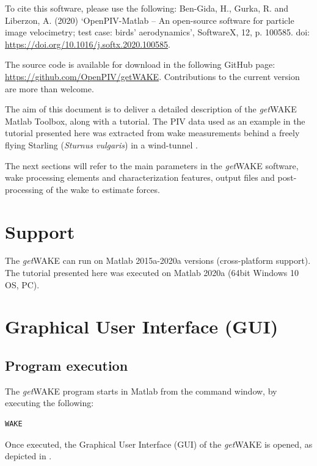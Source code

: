 \documentclass[12pt,a4paper]{article}
\begin{document}
To cite this software, please use the following:
Ben-Gida, H., Gurka, R. and Liberzon, A. (2020) `OpenPIV-Matlab -- An open-source software for particle image velocimetry; test case: birds' aerodynamics', SoftwareX, 12, p. 100585. doi: \url{https://doi.org/10.1016/j.softx.2020.100585}.

The source code is available for download in the following GitHub page: \url{https://github.com/OpenPIV/getWAKE}. Contributions to the current version are more than welcome.

The aim of this document is to deliver a detailed description of the \textit{get}WAKE Matlab Toolbox, along with a tutorial. The PIV data used as an example in the tutorial presented here was extracted from wake measurements behind a freely flying Starling (\textit{Sturnus vulgaris}) in a wind-tunnel \cite{Ben-Gida2013,Stalnov2015,Nafi2020}. 

The next sections will refer to the main parameters in the \textit{get}WAKE software, wake processing elements and characterization features, output files and post-processing of the wake to estimate forces. 

\section{Support}\label{Support}

The \textit{get}WAKE can run on Matlab 2015a-2020a versions (cross-platform support).
The tutorial presented here was executed on Matlab 2020a (64bit Windows 10 OS, PC).


\section{Graphical User Interface (GUI)}\label{GUI}

\subsection{Program execution}
The \textit{get}WAKE program starts in Matlab from the command window, by executing the following:

\begin{lstlisting}
WAKE
\end{lstlisting}

Once executed, the Graphical User Interface (GUI) of the \textit{get}WAKE is opened, as depicted in .
\end{document}
